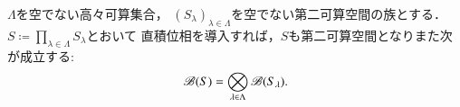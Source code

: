 	\begin{prf}
		
	\end{prf}
	
	\begin{screen}
		\begin{thm}[第二可算空間の直積Borel集合族]\label{thm:Borel_algebra_of_products_of_second_countable_spaces}
			$\Lambda$を空でない高々可算集合，
			$(S_\lambda)_{\lambda \in \Lambda}$を空でない第二可算空間の族とする．
			$S \coloneqq \prod_{\lambda \in \Lambda} S_\lambda$とおいて
			直積位相を導入すれば，$S$も第二可算空間となりまた次が成立する:
			\begin{align}
				\mathscr{B}(S) = \bigotimes_{\lambda \in \Lambda} \mathscr{B}(S_\lambda).
				\label{eq:lem1_for_chap_1_exercise_1_8_1}
			\end{align}
		\end{thm}
	\end{screen}


